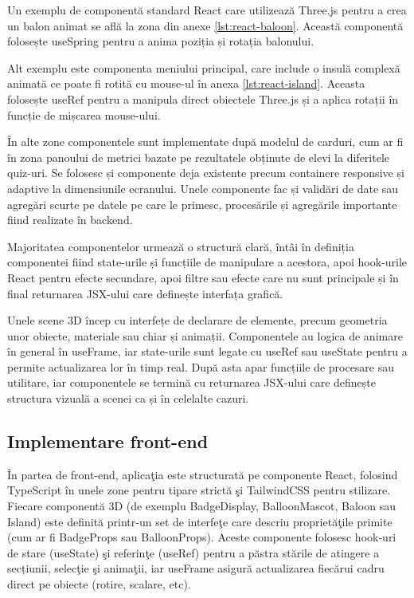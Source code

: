 Un exemplu de componentă standard React care utilizează Three.js pentru a crea un balon animat se află
la zona din anexe \ref{lst:react-baloon}. Această componentă folosește useSpring pentru a anima 
poziția și rotația balonului.

\vspace{0.5em}

Alt exemplu este componenta meniului principal, care include o insulă complexă animată ce 
poate fi rotită cu mouse-ul în anexa \ref{lst:react-island}. Aceasta folosește
useRef pentru a manipula direct obiectele Three.js și a aplica rotații în funcție
de mișcarea mouse-ului.

În alte zone componentele sunt implementate după modelul de carduri, cum ar fi în zona
panoului de metrici bazate pe rezultatele obținute de elevi
la diferitele quiz-uri. Se folosesc și componente deja existente precum containere responsive
și adaptive la dimensiunile ecranului. Unele componente fac și validări de date sau agregări
scurte pe datele pe care le primesc, procesările și agregările importante fiind realizate
în backend.

Majoritatea componentelor urmează o structură clară, întâi în definiția componentei fiind
state-urile și funcțiile de manipulare a acestora, apoi hook-urile React pentru
efecte secundare, apoi filtre sau efecte care nu sunt principale și în final 
returnarea JSX-ului care definește interfața grafică.

Unele scene 3D încep cu interfețe de declarare de elemente, precum geometria unor obiecte,
materiale sau chiar și animații. Componentele au logica de animare în general în useFrame, iar
state-urile sunt legate cu useRef sau useState pentru a permite actualizarea lor în timp real.
După asta apar funcțiile de procesare sau utilitare, iar componentele se termină cu 
returnarea JSX-ului care definește structura vizuală a scenei ca și în celelalte cazuri.

\subsection{Implementare front-end}
\label{subsec:implementare-frontend}

În partea de front-end, aplicaţia este structurată pe componente React,
folosind TypeScript în unele zone pentru tipare strictă şi TailwindCSS pentru stilizare.
Fiecare componentă 3D (de exemplu BadgeDisplay, BalloonMascot,
Baloon sau Island) este definită printr‐un set de interfeţe 
care descriu proprietăţile primite (cum ar fi BadgeProps sau BalloonProps).
Aceste componente folosesc hook‐uri de stare (useState) şi referinţe
(useRef) pentru a păstra stările de atingere a secțiunii, selecţie şi animaţii, 
iar useFrame asigură actualizarea fiecărui cadru direct pe obiecte (rotire, scalare, etc).


